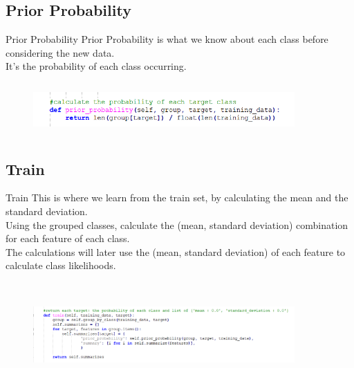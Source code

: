 \documentclass{beamer}
\begin{document}
\subsection{Prior Probability}
    \begin{frame}{Prior Probability}
        \hspace{0.5cm} Prior Probability is what we know about each class before considering the new data. \\
        \hspace{0.5cm} It's the probability of each class occurring. \\
        \begin{center}
            \begin{figure}
                \begin{center}
                    \includegraphics[width = 10cm, height = 2cm]{Theme/images/prior_prob.PNG}
                \end{center}
            \end{figure}
        \end{center}
    \end{frame}

\subsection{Train}
    \begin{frame}{Train}
        \hspace{0.5cm} This is where we learn from the train set, by calculating the mean and the standard deviation.\\
        \hspace{0.5cm} Using the grouped classes, calculate the (mean, standard deviation) combination for each feature of each class. \\
        \hspace{0.5cm} The calculations will later use the (mean, standard deviation) of each feature to calculate class likelihoods. \\
        \begin{center}
            \begin{figure}
                \begin{center}
                    \includegraphics[width = 10cm, height = 4cm]{Theme/images/train.PNG}
                \end{center}
            \end{figure}
        \end{center}
    \end{frame}
\end{document}
